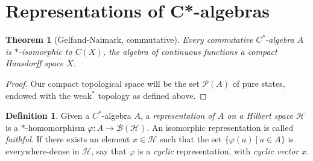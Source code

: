 \documentclass[12pt,a4paper]{amsart}
\theoremstyle{plain}
\newtheorem{thm}{Theorem}
\theoremstyle{definition}
\newtheorem{defn}{Definition}
\renewcommand{\H}{\mathcal{H}}
\newcommand{\B}{\mathcal{B}}
\newcommand{\BH}{\mathcal{\B(\H)}}
\newcommand{\1}{\mathbbm{1}}
\renewcommand{\phi}{\varphi}
\newcommand{\CX}{C(X)}
\renewcommand{\P}[1]{\mathscr{P}(#1)}
\begin{document}


\section{Representations of C*-algebras}

	
\begin{thm}[Gelfand-Naimark, commutative] 
	Every commutative $C^\ast$-algebra $A$ is $\ast$-isomorphic to $\CX$,
	the algebra of continuous functions a compact Hausdorff space $X$.
\end{thm}
\begin{proof}
	Our compact topological space will be the set $\P{A}$ of pure states, endowed 
	with the weak$^\ast$ topology as defined above. 
\end{proof}

	

\begin{defn}
	Given a $C^\ast$-algebra $A$, a \emph{representation of $A$ on a Hilbert space $\H$} 
	is a $\ast$-homomorphism $\phi: A \to \BH$. 
	An isomorphic representation is called \emph{faithful}.
	If there exists an element $x\in\H$ such that the set $\{\phi(a) ~|~ a\in A\}$ is
	everywhere-dense in $\H$, say that $\phi$ is a \emph{cyclic} representation, 
	with \emph{cyclic vector} $x$.
\end{defn}	
	
\end{document}
